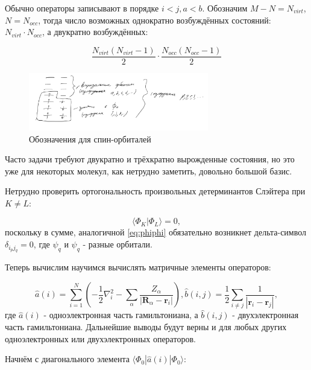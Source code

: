 \documentclass[12pt, oneside]{article}
\numberwithin{equation}{section}  %
\begin{document}
Обычно операторы записывают в порядке \(i < j, a < b\). Обозначим \(M - N = N_{virt}\), \(N = N_{occ}\), тогда число возможных однократно возбуждённых состояний: \(N_{virt} \cdot N_{occ}\), а двукратно возбуждённых:

\[
\frac{N_{virt}(N_{virt} - 1)}{2} \cdot \frac{N_{occ}(N_{occ} - 1)}{2}
\]

\begin{figure}
    \includegraphics[width=0.7\textwidth]{./images/spin-orbitals2.png}
    \caption{Обозначения для спин-орбиталей}
    \label{fig:spin-orbitals2}
\end{figure}

Часто задачи требуют двукратно и трёхкратно вырожденные состояния, но это уже для некоторых молекул, как нетрудно заметить, довольно большой базис. 

Нетрудно проверить ортогональность произвольных детерминантов Слэйтера при \(K \neq L\):

\[\langle \Phi_K | \Phi_L \rangle = 0,\]
поскольку в сумме, аналогичной \eqref{eq:phiphi} обязательно возникнет дельта-символ \(\delta_{i_{p}j_{q}} = 0\), где \(\psi_q\) и \(\psi_q\) - разные орбитали.

Теперь вычислим научимся вычислять матричные элементы операторов:

\begin{equation}
\hat{a}(i) = \sum_{i=1}^{N} \left(- \dfrac{1}{2} \nabla_i^2 - \sum_\alpha \dfrac{Z_\alpha}{|\bm{R}_\alpha - \bm{r}_i|}\right), \hat{b}(i, j) = \dfrac{1}{2} \sum_{i\neq j } \dfrac{1}{|\bm{r}_i - \bm{r}_j|},
\end{equation}
где \(\hat{a}(i)\) - одноэлектронная часть гамильтониана, а \(\hat{b}(i, j)\) - двухэлектронная часть гамильтониана. Дальнейшие выводы будут верны и для любых других одноэлектронных или двухэлектронных операторов.

Начнём с диагонального элемента \(\langle \Phi_0 | \hat{a}(i) | \Phi_0 \rangle\):
\end{document}
